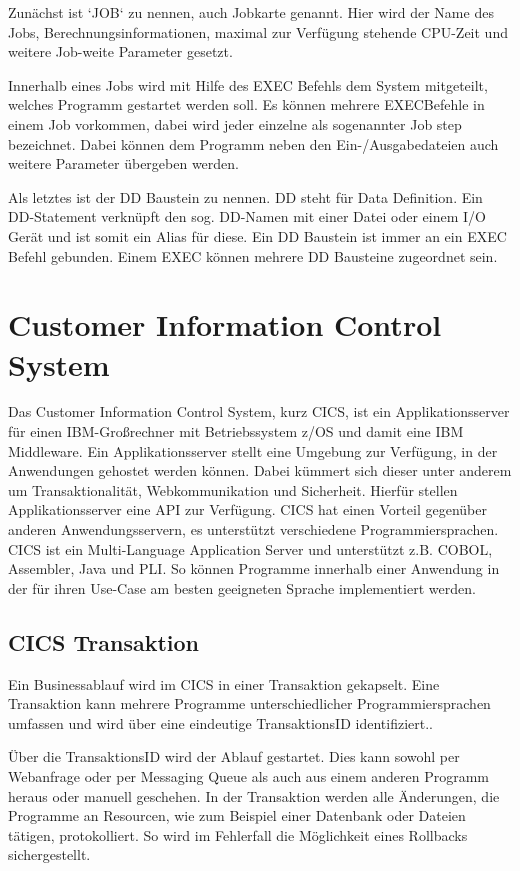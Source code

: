 Zunächst ist `JOB` zu nennen, auch Jobkarte genannt.
Hier wird der Name des Jobs, Berechnungsinformationen, maximal zur Verfügung stehende CPU-Zeit und weitere Job-weite Parameter gesetzt.

Innerhalb eines Jobs wird mit Hilfe des \glqq EXEC\grqq{} Befehls dem System mitgeteilt, welches Programm gestartet werden soll.
Es können mehrere \glqq EXEC\dq  Befehle in einem Job vorkommen, dabei wird jeder einzelne als sogenannter \glqq Job step\grqq{} bezeichnet.
Dabei können dem Programm neben den Ein-/Ausgabedateien auch weitere Parameter übergeben werden.

Als letztes ist der \glqq DD\grqq{} Baustein zu nennen.
\glqq DD\grqq{} steht für Data Definition.
Ein DD-Statement verknüpft den sog. DD-Namen mit einer Datei oder einem I/O Gerät und ist somit ein Alias für diese.
Ein \glqq DD\grqq{} Baustein ist immer an ein \glqq EXEC\grqq{} Befehl gebunden.
Einem \glqq EXEC\grqq{} können mehrere \glqq DD\grqq{} Bausteine zugeordnet sein. 
\cite{Ebbers.2011}

\section{Customer Information Control System}\label{cics}
Das Customer Information Control System, kurz CICS, ist ein Applikationsserver für einen IBM-Großrechner mit Betriebssystem z/OS und damit eine IBM Middleware.
Ein Applikationsserver stellt eine Umgebung zur Verfügung, in der Anwendungen gehostet werden können.
Dabei kümmert sich dieser unter anderem um Transaktionalität, Webkommunikation und Sicherheit.
Hierfür stellen Applikationsserver eine API zur Verfügung.
CICS hat einen Vorteil gegenüber anderen Anwendungsservern, es unterstützt verschiedene Programmiersprachen.
CICS ist ein Multi-Language Application Server und unterstützt z.B. COBOL, Assembler, Java und PLI.
So können Programme innerhalb einer Anwendung in der für ihren Use-Case am besten geeigneten Sprache implementiert werden.
\cite{Rayns.2011}

\subsection{CICS Transaktion}\label{subsec:trans}
Ein Businessablauf wird im CICS in einer Transaktion gekapselt.
Eine Transaktion kann mehrere Programme unterschiedlicher Programmiersprachen umfassen und wird über eine eindeutige \glqq TransaktionsID\grqq{} identifiziert..

Über die TransaktionsID wird der Ablauf gestartet.
Dies kann sowohl per Webanfrage oder per Messaging Queue als auch aus einem anderen Programm heraus oder manuell geschehen.
In der Transaktion werden alle Änderungen, die Programme an Resourcen, wie zum Beispiel einer Datenbank oder Dateien tätigen, protokolliert.
So wird im Fehlerfall die Möglichkeit eines Rollbacks sichergestellt.
 \cite{Rayns.2011}

